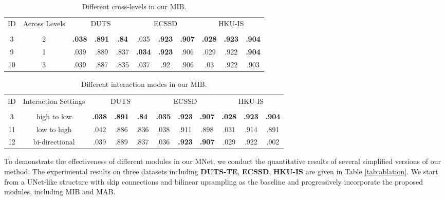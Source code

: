 \documentclass[lettersize,journal]{IEEEtran}
\begin{document}
\begin{table}
	\centering
	\scriptsize
	\caption{Different cross-levels in our MIB. }
	\label{tab:mib}
	\setlength\tabcolsep{0.5mm}
	\begin{tabular}{c|c|ccc|ccc|ccc}\hline
		\multirow{2}{*}{ID} & \multirow{2}{*}{Across Levels} & \multicolumn{3}{c|}{DUTS} & \multicolumn{3}{c|}{ECSSD} & \multicolumn{3}{c}{HKU-IS}\\
		&&  &  &  &  &  &  &  &  &  \\
		\hline
		3& 2 & \textbf{.038} & \textbf{.891} & \textbf{.84} & {.035} & \textbf{.923} & \textbf{.907} & \textbf{.028} & \textbf{.923} & \textbf{.904} \\
		9& 1 & .039 & .889 & .837 & \textbf{.034} & \textbf{.923} & .906 & .029 & {.922} & \textbf{.904} \\ 
		10& 3 & .039 & .887 & .835 & .037 & {.92} & .906 & .03 & {.922} & .903 \\
		\hline
	\end{tabular}
\end{table}
\begin{table}
	\centering
	\scriptsize
	\caption{Different interaction modes in our MIB. }
	\label{tab:mib2}
	\setlength\tabcolsep{0.5mm}
	\begin{tabular}{c|c|ccc|ccc|ccc}\hline
		\multirow{2}{*}{ID} & \multirow{2}{*}{Interaction Settings} & \multicolumn{3}{c|}{DUTS} & \multicolumn{3}{c|}{ECSSD} & \multicolumn{3}{c}{HKU-IS}\\
		&&  &  &  &  &  &  &  &  &  \\
		\hline
		3& high to low & \textbf{.038} & \textbf{.891} & \textbf{.84} & \textbf{.035} & \textbf{.923} & \textbf{.907} & \textbf{.028} & \textbf{.923} & \textbf{.904} \\
		11& low to high & .042 & .886 & .836 & {.038} & {.911} & .898 & .031 & {.914} & {.891} \\ 
		12& bi-directional & .039 & .889 & .837 & .036 & \textbf{.923} & \textbf{.907} & .029 & {.922} & .902 \\
		\hline
	\end{tabular}
\end{table}
To demonstrate the effectiveness of different modules in our MNet, we conduct the quantitative results of several simplified versions of our method. The experimental results on three datasets including \textbf{DUTS-TE}, \textbf{ECSSD}, \textbf{HKU-IS} are given in Table \ref{tab:ablation}. We start from a UNet-like structure with skip connections and bilinear upsampling as the baseline and progressively incorporate the proposed modules, including MIB and MAB. 
\end{document}
